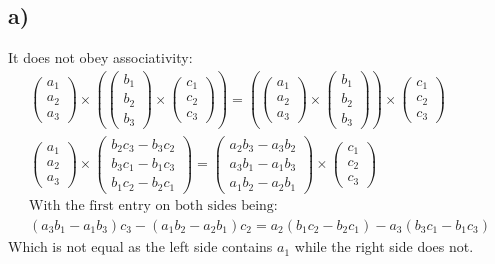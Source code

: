 \documentclass[]{scrartcl}
\begin{document}
\subsection{a)}
It does not obey associativity:
\begin{gather}
	\begin{pmatrix}
		a_1 \\ a_2 \\ a_3
	\end{pmatrix}\times \left(
		\begin{pmatrix}
			b_1 \\ b_2 \\ b_3
		\end{pmatrix} \times
		\begin{pmatrix}
			c_1 \\ c_2 \\ c_3
		\end{pmatrix}
	\right)
	=
	\left(
\begin{pmatrix}
		a_1 \\ a_2 \\ a_3
	\end{pmatrix}\times
		\begin{pmatrix}
			b_1 \\ b_2 \\ b_3
		\end{pmatrix}
		\right)\times
		\begin{pmatrix}
			c_1 \\ c_2 \\ c_3
		\end{pmatrix}
	\\
	\begin{pmatrix}
		a_1\\a_2\\a_3
	\end{pmatrix}\times
	\begin{pmatrix}
		b_2c_3 - b_3c_2 \\ b_3c_1 - b_1c_3\\ b_1c_2 - b_2c_1
	\end{pmatrix}
	=
	\begin{pmatrix}
		a_2b_3 - a_3b_2 \\ a_3b_1 - a_1b_3\\ a_1b_2 - a_2b_1
	\end{pmatrix}\times
	\begin{pmatrix}
		c_1 \\ c_2 \\ c_3
	\end{pmatrix}
	\\
	\text{With the first entry on both sides being:}\nonumber\\
	(a_3b_1 - a_1b_3)c_3 - (a_1b_2 - a_2b_1)c_2 = a_2(b_1c_2 - b_2c_1) - a_3(b_3c_1 - b_1c_3)
\end{gather}
Which is not equal as the left side contains $a_1$ while the right side does not.
\end{document}
